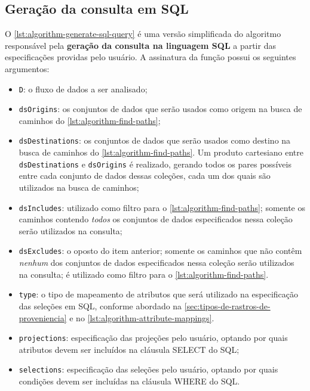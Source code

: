 \subsection{Geração da consulta em SQL}

O \autoref{lst:algorithm-generate-sql-query} é uma versão simplificada do algoritmo responsável pela \textbf{geração da consulta na linguagem SQL} a partir das especificações providas pelo usuário. A assinatura da função possui os seguintes argumentos:

\begin{itemize}
    \item \texttt{D}: o fluxo de dados a ser analisado;
    \item \texttt{dsOrigins}: os conjuntos de dados que serão usados como origem na busca de caminhos do \autoref{lst:algorithm-find-paths};
    \item \texttt{dsDestinations}: os conjuntos de dados que serão usados como destino na busca de caminhos do \autoref{lst:algorithm-find-paths}. Um produto cartesiano entre \texttt{dsDestinations} e \texttt{dsOrigins} é realizado, gerando todos os pares possíveis entre cada conjunto de dados dessas coleções, cada um dos quais são utilizados na busca de caminhos;
    \item \texttt{dsIncludes}: utilizado como filtro para o \autoref{lst:algorithm-find-paths}; somente os caminhos contendo \emph{todos} os conjuntos de dados especificados nessa coleção serão utilizados na consulta;
    \item \texttt{dsExcludes}: o oposto do item anterior; somente os caminhos que não contêm \emph{nenhum} dos conjuntos de dados especificados nessa coleção serão utilizados na consulta; é utilizado como filtro para o \autoref{lst:algorithm-find-paths}.
    \item \texttt{type}: o tipo de mapeamento de atributos que será utilizado na especificação das seleções em SQL, conforme abordado na \autoref{sec:tipos-de-rastros-de-proveniencia} e no \autoref{lst:algorithm-attribute-mappings}.
    \item \texttt{projections}: especificação das projeções pelo usuário, optando por quais atributos devem ser incluídos na cláusula \textsc{SELECT} do SQL;
    \item \texttt{selections}: especificação das seleções pelo usuário, optando por quais condições devem ser incluídas na cláusula \textsc{WHERE} do SQL.
\end{itemize}

